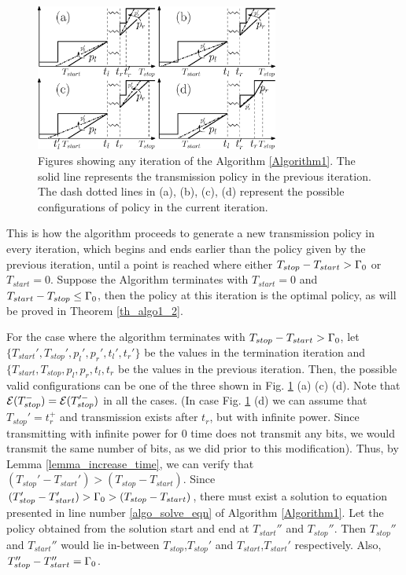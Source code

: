 \begin{figure}
\centering
  \centerline{\includegraphics[width=8cm]{Algorithm1.eps}}
\caption{Figures showing any iteration of the Algorithm \ref{Algorithm1}. The solid line represents the transmission policy in the previous iteration. The dash dotted lines in (a), (b), (c), (d) represent the possible configurations of policy in the current iteration.}\label{figure_Algorithm1}
\end{figure}

This is how the algorithm proceeds to generate a new transmission policy in every iteration, which begins and ends earlier than the policy given by the previous iteration, until a point is reached where either $T_{stop}-T_{start}>\Gamma_0$ or $T_{start}=0$. Suppose the Algorithm terminates with $T_{start}=0$ and $T_{start}-T_{stop}\le\Gamma_0$, then the policy at this iteration is the optimal policy, as will be proved in Theorem \ref{th_algo1_2}. 


For the case where the algorithm terminates with $T_{stop}-T_{start}>\Gamma_0$, let $\{T_{start}',T_{stop}',p_l',p_r',t_l',t_r'\}$ be the values in the termination iteration and $\{T_{start},T_{stop},p_l,p_r,t_l,t_r$ be the values in the previous iteration. Then, the possible valid configurations can be one of the three shown in Fig. \ref{figure_Algorithm1} (a) (c) (d). Note that $\mathcal{E}(T_{stop}^-)=\mathcal{E}(T_{stop}'^-)$ in all the cases. (In case Fig. \ref{figure_Algorithm1} (d) we can assume that $T_{stop}'=t_r^+$ and transmission exists after $t_r$, but with infinite power. Since transmitting with infinite power for $0$ time does not transmit any bits, we would transmit the same number of bits, as we did prior to this modification). Thus, by Lemma \ref{lemma_increase_time}, we can verify that $(T_{stop}'-T_{start}')>(T_{stop}-T_{start})$. Since $(T_{stop}'-T_{start}')>\Gamma_0>(T_{stop}-T_{start})$, there must exist a solution to equation presented in line number \ref{algo_solve_eqn} of Algorithm \ref{Algorithm1}. Let the policy obtained from the solution start and end at $T_{start}''$ and $T_{stop}''$. Then $T_{stop}''$ and $T_{start}''$ would lie in-between $T_{stop}$,$T_{stop}'$ and $T_{start}$,$T_{start}'$ respectively. Also, $T_{stop}''-T_{start}''=\Gamma_0$.




